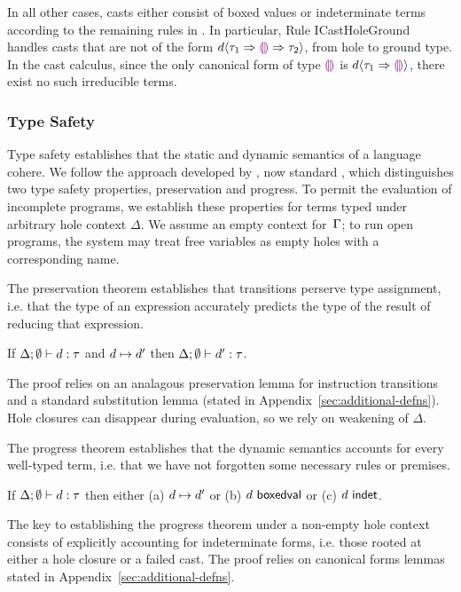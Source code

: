 In all other cases, casts either consist of boxed values or
indeterminate terms according to the remaining rules
in .
%
In particular, Rule {ICastHoleGround} handles casts that are not of
the form $d \langle{\tau_1}\Rightarrow{\textcolor{violet}{\llparenthesis}\textcolor{violet}{\rrparenthesis}}\Rightarrow{\tau_2}\rangle$, from hole to
ground type.
%
In the cast calculus, since the only canonical form of type $\textcolor{violet}{\llparenthesis}\textcolor{violet}{\rrparenthesis}$
is $d \langle{\tau_1}\Rightarrow{\textcolor{violet}{\llparenthesis}\textcolor{violet}{\rrparenthesis}}\rangle$, there exist no such
irreducible terms.

\subsubsection{Type Safety} 
%
Type safety establishes that the static and dynamic semantics of a
language cohere.
%
We follow the approach developed by \citet{wright94:_type_soundness},
now standard \cite{pfpl}, which distinguishes two type safety
properties, preservation and progress.
%
To permit the evaluation of incomplete programs, we establish these
properties for terms typed under arbitrary hole context $\Delta$.
%
We assume an empty context for~$\Gamma$; to run open programs, the
system may treat free variables as empty holes with a corresponding
name.

The preservation theorem establishes that transitions perserve type
assignment, i.e. that the type of an expression accurately predicts
the type of the result of reducing that expression.

\begin{thm}[Preservation]
  If $\Delta; \emptyset \vdash d : \tau$ and
  $d \mapsto d'$ then
  $\Delta; \emptyset \vdash d' : \tau$.
\end{thm}
\noindent
%
The proof relies on an analagous preservation lemma for instruction
transitions and a standard substitution lemma (stated in
Appendix~\ref{sec:additional-defns}).
%
Hole closures can disappear during evaluation, so we rely on weakening
of $\Delta$.

The progress theorem establishes that the dynamic semantics accounts
for every well-typed term, i.e. that we have not forgotten some
necessary rules or premises.
%
\begin{thm}[Progress]
  If $\Delta; \emptyset \vdash d : \tau$ then either
  (a) $d \mapsto d'$ or
  (b) $d~\mathsf{boxedval}$ or 
  (c) $d~\mathsf{indet}$.
\end{thm}
\noindent
The key to establishing the progress theorem under a non-empty hole
context consists of explicitly accounting for indeterminate forms,
i.e. those rooted at either a hole closure or a failed cast.
%
The proof relies on canonical forms lemmas stated in
Appendix~\ref{sec:additional-defns}.

